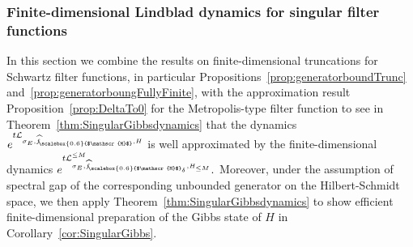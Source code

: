 \documentclass[11pt]{amsart}
\newcommand{\1}{\mathbbm{1}}
\newcommand{\cL}{\mathcal{L}}
\newcommand{\hatfM}{\widehat{f}_{\!\scalebox{0.6}{$\mathscr{M}$}}
}
\newcommand{\hatfMdelta}{\widehat{f}_{\!\scalebox{0.6}{$\mathscr{M}$}_\delta}}
\theoremstyle{plain}
\theoremstyle{definition}
\theoremstyle{remark}
\numberwithin{equation}{section}
\begin{document}
\subsubsection{Finite-dimensional Lindblad dynamics for singular filter functions}
\label{sec:FiniteDimPreperationSingular}
In this section we combine the results on finite-dimensional truncations for Schwartz filter functions, in particular Propositions~\ref{prop:generatorboundTrunc} and~\ref{prop:generatorboungFullyFinite}, with the approximation result Proposition~\ref{prop:DeltaTo0} for the Metropolis-type filter function to see in Theorem~\ref{thm:SingularGibbsdynamics} that the dynamics $e^{t\cL_{\sigma_E,\hatfM,H}}$ is well approximated by the finite-dimensional dynamics $e^{t\cL^{\le M}_{\sigma_E,\hatfMdelta,H_{\le M}}}.$ 
Moreover,  under the assumption of spectral gap of the corresponding unbounded generator on the Hilbert-Schmidt space,  we then apply Theorem~\ref{thm:SingularGibbsdynamics} to show efficient finite-dimensional preparation of the Gibbs state of $H$ in Corollary~\ref{cor:SingularGibbs}. 
\end{document}
